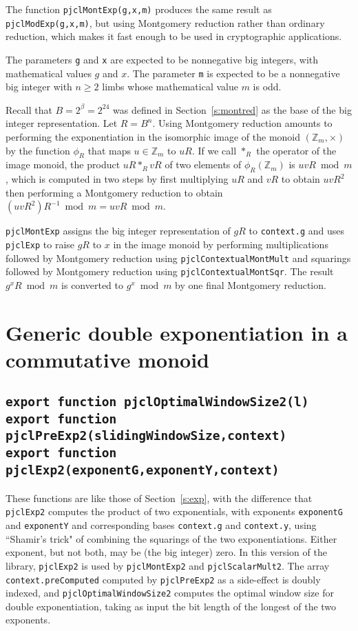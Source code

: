 \documentclass[12pt]{article}
\begin{document}
The function {\tt pjclMontExp(g,x,m)} produces the same result as {\tt
  pjclModExp(g,x,m)}, but using Montgomery reduction rather than
ordinary reduction, which makes it fast enough to be used in
cryptographic applications.

The parameters {\tt g} and {\tt x} are expected to be nonnegative big
integers, with mathematical values $g$ and $x$.  The
parameter {\tt m} is expected to be a nonnegative big integer with $n \geq 2$
limbs whose mathematical value $m$ is odd.

Recall that $B = 2^\beta = 2^{24}$ was defined in
Section~\ref{s:montred} as the base of the big integer representation.
Let $R = B^n$.  Using Montgomery reduction amounts to performing the
exponentiation in the isomorphic image of the monoid
$(\mathbb{Z}_m,\times)$ by the function $\phi_R$ that maps $u \in
\mathbb{Z}_m$ to $uR$.  If we call $\ast_R$ the operator of the image
monoid, the product $uR \ast_R vR$ of two elements of
$\phi_R(\mathbb{Z}_m)$ is $uvR \bmod m$, which is computed in two steps
by first multiplying $uR$ and $vR$ to obtain $uvR^2$ then performing a
Montgomery reduction to obtain $(uvR^2)R^{-1} \bmod m = uvR \bmod m$.

{\tt pjclMontExp} assigns the big integer representation of $gR$ to
{\tt context.g} and uses {\tt pjclExp} to raise $gR$ to $x$ in the
image monoid by performing multiplications followed by Montgomery
reduction using {\tt pjclContextualMontMult} and squarings followed by
Montgomery reduction using {\tt pjclContextualMontSqr}.  The result
$g^xR \bmod m$ is converted to $g^x \bmod m$ by one final Montgomery
reduction.

\section{Generic double exponentiation in a commutative monoid}

\subsection{\tt export function pjclOptimalWindowSize2(l)\\export function pjclPreExp2(slidingWindowSize,context)\\export function pjclExp2(exponentG,exponentY,context)}
These functions are like those of Section~\ref{s:exp}, with the difference that {\tt pjclExp2} computes the product of two exponentials, with exponents {\tt exponentG} and {\tt exponentY} and corresponding bases {\tt context.g} and {\tt context.y}, using ``Shamir's trick"
of combining the squarings of the two exponentiations.  
Either exponent, but not both, may be (the big integer) zero.
In this version of the library,
{\tt pjclExp2} is used by {\tt pjclMontExp2} and {\tt pjclScalarMult2}.  The array {\tt context.preComputed} computed by {\tt pjclPreExp2} as a side-effect
is doubly indexed, and {\tt pjclOptimalWindowSize2} computes the optimal window size for double exponentiation, taking as input the bit length of the longest of the two exponents.
\end{document}
